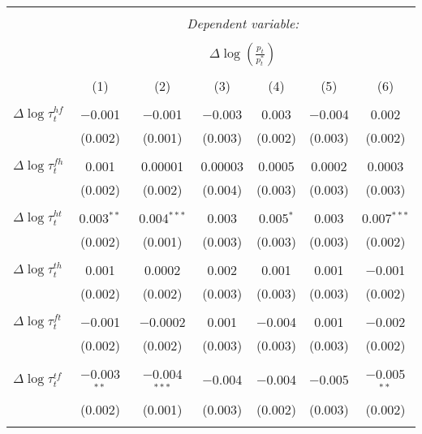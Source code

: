 
\begin{tabular}{@{\extracolsep{5pt}}lcccccc} 
\\[-1.8ex]\hline 
\hline \\[-1.8ex] 
 & \multicolumn{6}{c}{\textit{Dependent variable:}} \\ 
\cline{2-7} 
\\[-1.8ex] & \multicolumn{6}{c}{$\Delta \log \left(\frac{p_t}{p_t^*} \right)$} \\ 
\\[-1.8ex] & (1) & (2) & (3) & (4) & (5) & (6)\\ 
\hline \\[-1.8ex] 
 $\Delta \log \tau_t^{hf}$ & $-$0.001 & $-$0.001 & $-$0.003 & 0.003 & $-$0.004 & 0.002 \\ 
  & (0.002) & (0.001) & (0.003) & (0.002) & (0.003) & (0.002) \\ 
  & & & & & & \\ 
 $\Delta \log \tau_t^{fh}$ & 0.001 & 0.00001 & 0.00003 & 0.0005 & 0.0002 & 0.0003 \\ 
  & (0.002) & (0.002) & (0.004) & (0.003) & (0.003) & (0.003) \\ 
  & & & & & & \\ 
 $\Delta \log \tau_t^{ht}$ & 0.003$^{**}$ & 0.004$^{***}$ & 0.003 & 0.005$^{*}$ & 0.003 & 0.007$^{***}$ \\ 
  & (0.002) & (0.001) & (0.003) & (0.003) & (0.003) & (0.002) \\ 
  & & & & & & \\ 
 $\Delta \log \tau_t^{th}$ & 0.001 & 0.0002 & 0.002 & 0.001 & 0.001 & $-$0.001 \\ 
  & (0.002) & (0.002) & (0.003) & (0.003) & (0.003) & (0.002) \\ 
  & & & & & & \\ 
 $\Delta \log \tau_t^{ft}$ & $-$0.001 & $-$0.0002 & 0.001 & $-$0.004 & 0.001 & $-$0.002 \\ 
  & (0.002) & (0.002) & (0.003) & (0.003) & (0.003) & (0.002) \\ 
  & & & & & & \\ 
 $\Delta \log \tau_t^{tf}$ & $-$0.003$^{**}$ & $-$0.004$^{***}$ & $-$0.004 & $-$0.004 & $-$0.005 & $-$0.005$^{**}$ \\ 
  & (0.002) & (0.001) & (0.003) & (0.002) & (0.003) & (0.002) \\ 
  & & & & & & \\ 

\end{tabular}
